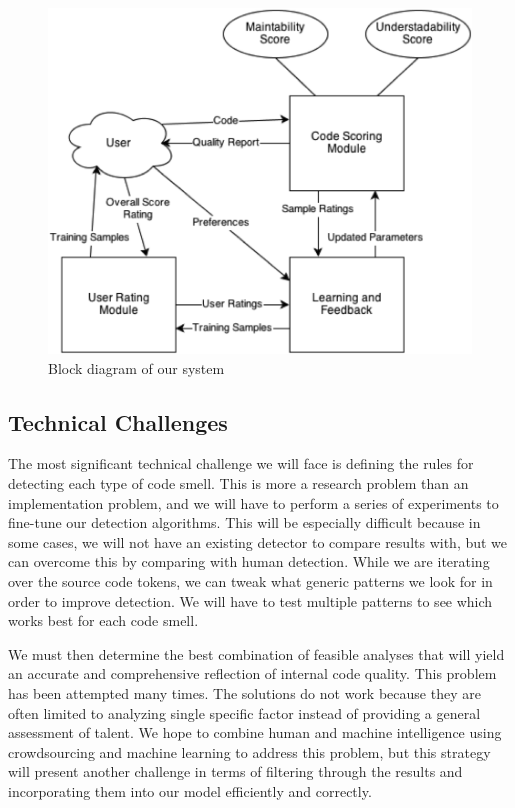 \documentclass{sig-alternate}
\begin{document}
\begin{figure}[htb!]
	\begin{center}
		\includegraphics[width=0.9\linewidth]{block_diagram}
	\end{center}
	\vspace{-12pt}
	\caption{Block diagram of our system}
	\label{fig:some_graph}
\end{figure}

\subsection{Technical Challenges}
\label{subsec:tech_challenges}

The most significant technical challenge we will face is defining the rules for detecting each type of code smell. This is more a research problem than an implementation problem, and we will have to perform a series of experiments to fine-tune our detection algorithms. This will be especially difficult because in some cases, we will not have an existing detector to compare results with, but we can overcome this by comparing with human detection. While we are iterating over the source code tokens, we can tweak what generic patterns we look for in order to improve detection. We will have to test multiple patterns to see which works best for each code smell.

We must then determine the best combination of feasible analyses that will yield an accurate and comprehensive reflection of internal code quality. This problem has been attempted many times. The solutions do not work because they are often limited to analyzing single specific factor instead of providing a general assessment of talent. We hope to combine human and machine intelligence using crowdsourcing and machine learning to address this problem, but this strategy will present another challenge in terms of filtering through the results and incorporating them into our model efficiently and correctly.
\end{document}
